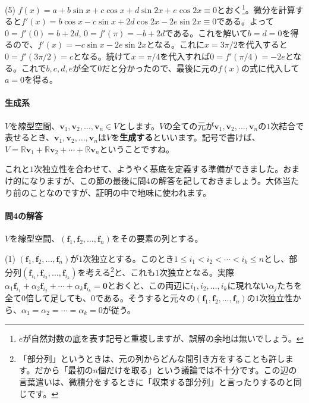 \noindent (5) $f(x) = a + b\sin x + c \cos x + d\sin 2x + e\cos 2x \equiv 0$とおく\footnote{$e$が自然対数の底を表す記号と重複しますが、誤解の余地は無いでしょう。}。微分を計算すると$f'(x) = b\cos x - c\sin x + 2d\cos 2x -2e\sin 2x \equiv 0$である。よって$0 = f'(0) = b + 2d$, $0  = f'(\pi) = -b + 2d$である。これを解いて$b = d = 0$を得るので、$f'(x) = -c\sin x - 2e\sin 2x$となる。これに$x = 3\pi/2$を代入すると$0 = f'(3\pi/2) = c$となる。続けて$x = \pi/4$を代入すれば$0 = f'(\pi/4) = -2e$となる。これで$b, c, d, e$が全て$0$だと分かったので、最後に元の$f(x)$の式に代入して$a = 0$を得る。

\paragraph{生成系}

$V$を線型空間、$\bm{v}_1, \bm{v}_2, \ldots, \bm{v}_n\in V$とします。$V$の全ての元が$\bm{v}_1, \bm{v}_2, \ldots, \bm{v}_n$の$1$次結合で表せるとき、$\bm{v}_1, \bm{v}_2, \ldots, \bm{v}_n$は$V$を\textbf{生成する}といいます。記号で書けば、$V = \mathbb{R}\bm{v}_1 + \mathbb{R}\bm{v}_2 + \cdots + \mathbb{R}\bm{v}_n$ということですね。

これと$1$次独立性を合わせて、ようやく基底を定義する準備ができました。おまけ的になりますが、この節の最後に問4の解答を記しておきましょう。大体当たり前のことなのですが、証明の中で地味に使われます。

\paragraph{問4の解答}

$V$を線型空間、$(\bm{f}_1, \bm{f}_2, \ldots, \bm{f}_n)$をその要素の列とする。

\noindent (1) $(\bm{f}_1, \bm{f}_2, \ldots, \bm{f}_n)$が$1$次独立とする。このとき$1\leq i_1 < i_2 < \cdots < i_k \leq n$とし、部分列$(\bm{f}_{i_1}, \bm{f}_{i_2}, \ldots, \bm{f}_{i_k})$を考える\footnote{「部分列」というときは、元の列からどんな間引き方をすることも許します。だから「最初の$n$個だけを取る」という議論では不十分です。この辺の言葉遣いは、微積分をするときに「収束する部分列」と言ったりするのと同じです。}と、これも$1$次独立となる。実際$\alpha_1 \bm{f}_{i_1} + \alpha_2 \bm{f}_{i_2} + \cdots  + \alpha_k \bm{f}_{i_k} = \bm{0}$とおくと、この両辺に$i_1, i_2, \ldots, i_k$に現れない$\alpha_j$たちを全て$0$倍して足しても、$0$である。そうすると元々の$(\bm{f}_1, \bm{f}_2, \ldots, \bm{f}_n)$の$1$次独立性から、$\alpha_1 = \alpha_2 = \cdots = \alpha_k = 0$が従う。

